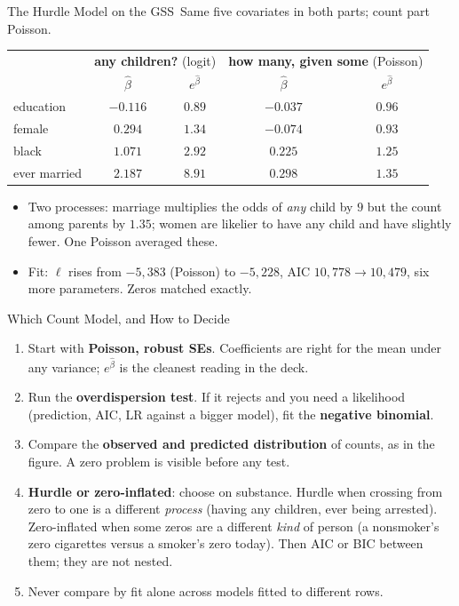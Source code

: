 \documentclass[aspectratio=169,11pt,xcolor=dvipsnames]{beamer}
\newcommand{\loglik}{\ell}
\newcommand{\core}{\,\raisebox{0.6pt}{\textcolor{corestar}{$\bigstar$}}}
\begin{document}
\begin{frame}{The Hurdle Model on the GSS\core}
\vskip-2pt
Same five covariates in both parts; count part Poisson.
\begin{center}\small
\renewcommand{\arraystretch}{0.95}
\begin{tabular}{lcc@{\qquad}cc}
\toprule
 & \multicolumn{2}{c}{\textbf{any children?} (logit)} & \multicolumn{2}{c}{\textbf{how many, given some} (Poisson)} \\
 & $\hat\beta$ & $e^{\hat\beta}$ & $\hat\beta$ & $e^{\hat\beta}$ \\
\midrule
education & $-0.116$ & $0.89$ & $-0.037$ & $0.96$ \\
female & $0.294$ & $1.34$ & $-0.074$ & $0.93$ \\
black & $1.071$ & $2.92$ & $0.225$ & $1.25$ \\
ever married & $2.187$ & $8.91$ & $0.298$ & $1.35$ \\
\bottomrule
\end{tabular}
\end{center}
\vskip2pt
\begin{itemize}\itemsep2pt
  \item Two processes: marriage multiplies the odds of \emph{any} child
        by $9$ but the count among parents by $1.35$; women are likelier
        to have any child and have slightly fewer. One Poisson averaged these.
  \item Fit: $\loglik$ rises from $-5{,}383$ (Poisson) to $-5{,}228$,
        AIC $10{,}778 \to 10{,}479$, six more parameters. Zeros matched exactly.
\end{itemize}
\end{frame}

\begin{frame}{Which Count Model, and How to Decide\core}
\begin{enumerate}\itemsep4pt
  \item Start with \textbf{Poisson, robust SEs}. Coefficients are right for
        the mean under any variance; $e^{\hat\beta}$ is the cleanest
        reading in the deck.
  \item Run the \textbf{overdispersion test}. If it rejects and
        you need a likelihood (prediction, AIC, LR against a bigger
        model), fit the \textbf{negative binomial}.
  \item Compare the \textbf{observed and predicted distribution} of counts,
        as in the figure. A zero problem is visible before any test.
  \item \textbf{Hurdle or zero-inflated}: choose on substance. Hurdle when
        crossing from zero to one is a different \emph{process}
        (having any children, ever being arrested). Zero-inflated when
        some zeros are a different \emph{kind} of person (a nonsmoker's
        zero cigarettes versus a smoker's zero today). Then AIC or BIC
        between them; they are not nested.
  \item Never compare by fit alone across models fitted to different rows.
\end{enumerate}
\end{frame}
\end{document}

